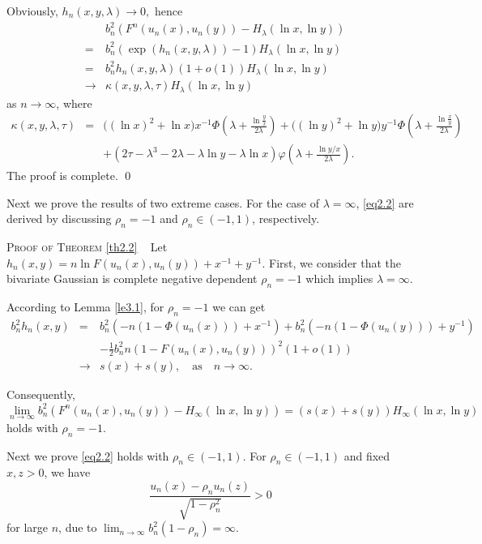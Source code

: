 \documentclass[10pt,twosided]{article}
\numberwithin{equation}{section}
\numberwithin{equation}{section}
\newcommand{\prooftheo}[1]{ \textsc{Proof of Theorem} \ref{#1} }
\begin{document}
Obviously, $h_n(x,y,\lambda)\to 0,$
hence
\begin{eqnarray*}
&&b_n^2(F^n(u_n(x),u_n(y))-H_{\lambda}(\ln x,\ln y))\\
&=&b_n^2(\exp\left(h_n(x,y,\lambda)\right)-1)H_{\lambda}(\ln x,\ln y)\\
&=&b_n^2h_n(x,y,\lambda)(1+o(1))H_{\lambda}(\ln x,\ln y)\\
&\to&\kappa(x,y,\lambda,\tau)H_{\lambda}(\ln x,\ln y)
\end{eqnarray*}
as $n\to \infty$, where
\begin{eqnarray}\label{addeq3.12}
\kappa(x,y,\lambda,\tau)
&=&\Big((\ln x)^2 + \ln x\Big)x^{-1}\Phi\left(\lambda+\frac{\ln \frac{y}{x}}{2\lambda}\right)
+\Big((\ln y)^2 + \ln y\Big)y^{-1}\Phi\left(\lambda+\frac{\ln \frac{x}{y}}{2\lambda}\right)\nonumber\\
&&+(2\tau -\lambda^3 -2\lambda -\lambda \ln y -\lambda \ln x)\varphi\left(\lambda+\frac{\ln y/x}{2\lambda}\right).
\end{eqnarray}
The proof is complete. \qed


Next we prove the results of two extreme cases. For the case of $\lambda=\infty$,
\eqref{eq2.2} are derived by discussing $\rho_n=-1$ and $\rho_n\in (-1,1)$, respectively.


\prooftheo{th2.2}~ Let $h_n(x,y)=n\ln F(u_n(x),u_n(y))+x^{-1}+y^{-1}$.
First, we consider that the bivariate Gaussian is complete negative dependent $\rho_n= -1$ which implies $\lambda=\infty$.

According to Lemma \ref{le3.1}, for $\rho_n=-1$ we can get
\begin{eqnarray*}
b_n^2h_n(x,y)&=&b_n^2(-n(1-\Phi(u_n(x)))+x^{-1})+b_n^2(-n(1-\Phi(u_n(y)))+y^{-1})\\
&& -\frac{1}{2}b_n^2n(1-F(u_n(x),u_n(y)))^2(1+o(1))\\
&\to&s(x)+s(y), \quad \mbox{as}\quad n\to \infty.
\end{eqnarray*}

Consequently,
\begin{equation*}
\lim_{n\to \infty}b_n^2(F^n(u_n(x),u_n(y))-H_{\infty}(\ln x,\ln y))=(s(x)+s(y))H_{\infty}(\ln x,\ln y)
\end{equation*}
holds with $\rho_n= -1$.

Next we prove \eqref{eq2.2} holds with $\rho_n\in(-1,1)$.
For $\rho_n \in (-1,1)$ and fixed $x,z>0$, we have
$$\frac{u_n(x)-\rho_nu_n(z)}{\sqrt{1-\rho_n^2}}>0$$
for large $n$, due to $\lim_{n\to \infty}b_n^2(1-\rho_n)=\infty$.
\end{document}
